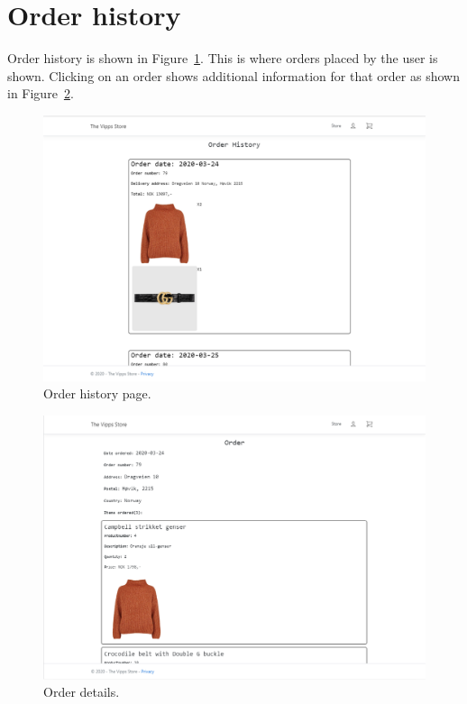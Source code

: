 \documentclass[11pt,a4paper,english]{article}
\begin{document}
\section*{Order history}
Order history is shown in Figure~\ref{fig:history}. This is where orders placed by the user is shown. Clicking on an order shows additional information for that order as shown in Figure~\ref{fig:historydetails}.
\begin{figure}[htbp]
  \centering
  \includegraphics[scale=0.3]{orderhistory}
  \caption{Order history page.}
  \label{fig:history}
\end{figure}
\begin{figure}[htbp]
  \centering
  \includegraphics[scale=0.3]{orderhistorydetails}
  \caption{Order details.}
  \label{fig:historydetails}
\end{figure}
\end{document}
